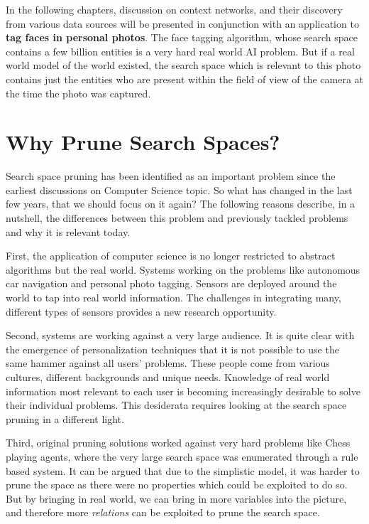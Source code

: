 In the following chapters, discussion on context networks, and their discovery from various data sources will be presented in conjunction with an application to \textbf{tag faces in personal photos}. The face tagging algorithm, whose search space contains a few billion entities is a very hard real world AI problem. But if a real world model of the world existed, the search space which is relevant to this photo contains just the entities who are present within the field of view of the camera at the time the photo was captured. 

\section{Why Prune Search Spaces?}
Search space pruning has been identified as an important problem since the earliest discussions on Computer Science topic. So what has changed in the last few years, that we should focus on it again? The following reasons describe, in a nutshell, the differences between this problem and previously tackled problems and why it is relevant today.

First, the application of computer science is no longer restricted to abstract algorithms but the real world. Systems working on the problems like autonomous car navigation and personal photo tagging. Sensors are deployed around the world to tap into real world information. The challenges in integrating many, different types of sensors provides a new research opportunity.

Second, systems are working against a very large audience. It is quite clear with the emergence of personalization techniques that it is not possible to use the same hammer against all users' problems. These people come from various cultures, different backgrounds and unique needs. Knowledge of real world information most relevant to each user is becoming increasingly desirable to solve their individual problems. This desiderata requires looking at the search space pruning in a different light.

Third, original pruning solutions worked against very hard problems like Chess playing agents, where the very large search space was enumerated through a rule based system. It can be argued that due to the simplistic model, it was harder to prune the space as there were no properties which could be exploited to do so. But by bringing in real world, we can bring in more variables into the picture, and therefore more \textit{relations} can be exploited to prune the search space.

